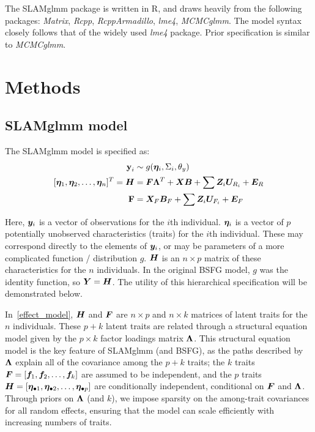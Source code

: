 \documentclass[11pt]{amsart}
\newcommand*{\B}[1]{\ifmmode\bm{#1}\else\textbf{#1}\fi}
\begin{document}
The SLAMglmm package is written in R, and draws heavily from the following packages: \emph{Matrix}, \emph{Rcpp}, \emph{RcppArmadillo}, \emph{lme4}, \emph{MCMCglmm}. The model syntax closely follows that of the widely used \emph{lme4} package. Prior specification is similar to \emph{MCMCglmm}.


\section{Methods}
\subsection{SLAMglmm model}
The SLAMglmm model is specified as:
\begin{align}
\label{effect_model}
\begin{split}
\B{y}_i &\sim g(\B{\eta}_i,\Sigma_{i},\theta_y) \\
[\B{\eta}_1, \B{\eta}_2, \dots, \B{\eta}_n]^T = \B{H} &=  \B{F}\B{\Lambda}^T + \B{X}\B{B} + \sum \B{Z}_i \B{U}_{R_i} + \B{E}_R \\
\B{F} &= \B{X}_F\B{B}_F + \sum \B{Z}_i \B{U}_{F_i} + \B{E}_F 
\end{split}
\end{align}

Here, $\B{y}_i$ is a vector of observations for the $i$th individual. 
$\B{\eta}_i$ is a vector of $p$ potentially unobserved characteristics (traits) for the $i$th individual. These may correspond directly to the elements of $\B{y}_i$, or may be parameters of a more complicated function / distribution $g$. $\B{H}$ is an $n \times p$ matrix of these characteristics for the $n$ individuals. In the original BSFG model, $g$ was the identity function, so $\B{Y} = \B{H}$. The utility of this hierarchical specification will be demonstrated below.

In~\ref{effect_model}, $\B{H}$ and $\B{F}$ are $n \times p$ and $n \times k$ matrices of latent traits for the $n$ individuals. These $p+k$ latent traits are related through a structural equation model given by the $p \times k$ factor loadings matrix $\B{\Lambda}$.  This structural equation model is the key feature of SLAMglmm (and BSFG), as the paths described by $\B{\Lambda}$ explain all of the covariance among the $p + k$ traits; the $k$ traits $\B{F} = [\B{f}_1, \B{f}_2,\dots, \B{f}_k]$ are assumed to be independent, and the $p$ traits $\B{H} = [\B{\eta}_{\bullet 1}, \B{\eta}_{\bullet 2},\dots,\B{\eta}_{\bullet p}]$ are conditionally independent, conditional on $\B{F}$ and $\B{\Lambda}$. Through priors on $\B{\Lambda}$ (and $k$), we impose sparsity on the among-trait covariances for all random effects, ensuring that the model can scale efficiently with increasing numbers of traits.
\end{document}
